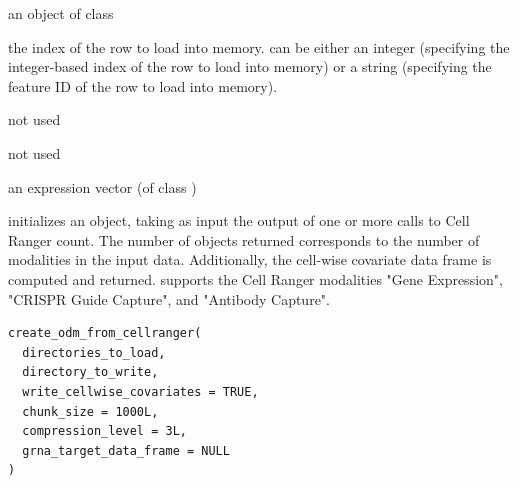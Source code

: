 \documentclass[a4paper]{book}
\begin{document}
%
\begin{Arguments}
\begin{ldescription}
\item[\code{x}] an object of class 

\item[\code{i}] the index of the row to load into memory.  can be either an integer (specifying the integer-based index of the row to load into memory) or a string (specifying the feature ID of the row to load into memory).

\item[\code{j}] not used

\item[\code{drop}] not used
\end{ldescription}
\end{Arguments}
%
\begin{Value}
an expression vector (of class )
\end{Value}
%
\begin{Examples}
\end{Examples}
%
\begin{Description}
 initializes an  object, taking as input the output of one or more calls to Cell Ranger count. The number of  objects returned corresponds to the number of modalities in the input data. Additionally, the cell-wise covariate data frame is computed and returned.  supports the Cell Ranger modalities "Gene Expression", "CRISPR Guide Capture", and "Antibody Capture".
\end{Description}
%
\begin{Usage}
\begin{verbatim}
create_odm_from_cellranger(
  directories_to_load,
  directory_to_write,
  write_cellwise_covariates = TRUE,
  chunk_size = 1000L,
  compression_level = 3L,
  grna_target_data_frame = NULL
)
\end{verbatim}
\end{Usage}
\end{document}
